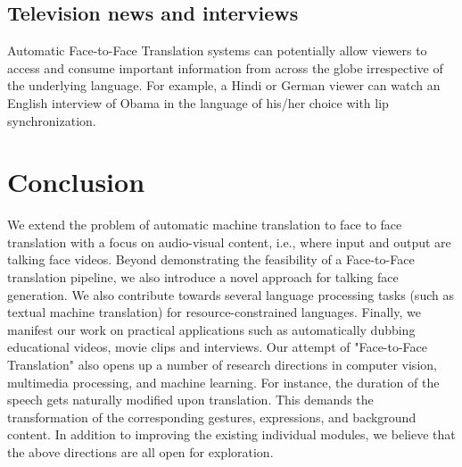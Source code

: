 \documentclass[sigconf]{acmart}
\begin{document}
\subsection{Television news and interviews}
Automatic Face-to-Face Translation systems can potentially allow viewers to access and consume important information from across the globe irrespective of the underlying language. For example, a Hindi or German viewer can watch an English interview of Obama in the language of his/her choice with lip synchronization.

\section{Conclusion}
\label{section:conclusion}
We extend the problem of automatic machine translation to face to face translation with a focus on audio-visual content, i.e., where input and output are talking face videos. Beyond demonstrating the feasibility of a Face-to-Face translation pipeline, we also introduce a novel approach for talking face generation. We also contribute towards several language processing tasks (such as textual machine translation) for resource-constrained languages. Finally, we manifest our work on practical applications such as automatically dubbing educational videos, movie clips and interviews. 
Our attempt of "Face-to-Face Translation" also opens up a number of research directions in computer vision, multimedia processing, and machine learning. For instance, the duration of the speech gets naturally modified upon translation. This demands the transformation of the corresponding gestures, expressions, and background content. In addition to improving the existing individual modules, we believe that the above directions are all open for exploration.

\newpage

\balance

\end{document}
